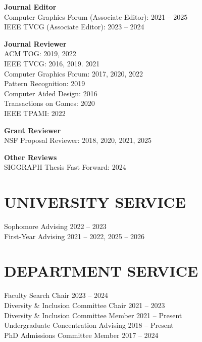 \documentclass[line,margin]{res}
\begin{document}
\begin{resume}
\textbf{Journal Editor}\\
Computer Graphics Forum (Associate Editor): 2021 -- 2025\\
IEEE TVCG (Associate Editor): 2023 -- 2024

\textbf{Journal Reviewer}\\
ACM TOG: 2019, 2022\\
IEEE TVCG: 2016, 2019. 2021\\
Computer Graphics Forum: 2017, 2020, 2022\\
Pattern Recognition: 2019\\
Computer Aided Design: 2016\\
Transactions on Games: 2020\\
IEEE TPAMI: 2022

\textbf{Grant Reviewer}\\
NSF Proposal Reviewer: 2018, 2020, 2021, 2025

\textbf{Other Reviews}\\
SIGGRAPH Thesis Fast Forward: 2024


\section{UNIVERSITY SERVICE}

Sophomore Advising \hfill 2022 -- 2023
\\
First-Year Advising \hfill 2021 -- 2022, 2025 -- 2026


\section{DEPARTMENT SERVICE}

Faculty Search Chair \hfill 2023 -- 2024
\\
Diversity \& Inclusion Committee Chair \hfill 2021 -- 2023
\\ 
Diversity \& Inclusion Committee Member \hfill 2021 -- Present
\\
Undergraduate Concentration Advising \hfill 2018 -- Present
\\ 
PhD Admissions Committee Member \hfill 2017 -- 2024




\end{resume}
\end{document}
